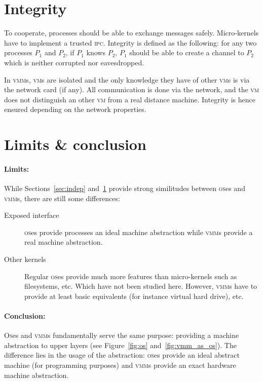 \documentclass[twocolumn]{article}
\newcommand{\vm}[0]{\textsc{vm}}
\newcommand{\vmm}[0]{\textsc{vmm}}
\newcommand{\os}[0]{\textsc{os}}
\begin{document}
\section{Integrity} 
\label{sec:int}
To cooperate, processes should be able to exchange messages safely. Micro-kernels have to implement a trusted \textsc{ipc}. Integrity is defined as the following: for any two processes $P_1$ and $P_2$, if $P_1$ knows $P_2$, $P_1$ should be able to create a channel to $P_2$ which is neither corrupted nor eavesdropped. 

In \vmm{}s, \vm{}s are isolated and the only knowledge they have of other \vm{}s is via the network card (if any). All communication is done via the network, and the \vm{} does not distinguish an other \vm{} from a real distance machine. Integrity is hence ensured depending on the network properties.

\section{Limits \& conclusion}
\paragraph{Limits:}
While Sections~\ref{sec:indep} and~\ref{sec:int} provide strong similitudes between \os{}es and \vmm{}s, there are still some differences: 
\begin{description}
	\item[Exposed interface] \os{}es provide processes an ideal machine abstraction while \vmm{}s provide a real machine abstraction. 
	\item[Other kernels] Regular \os{}es provide much more features than micro-kernels such as filesystems, etc. Which have not been studied here. However, \vmm{}s have to provide at least basic equivalents (for instance virtual hard drive), etc.
\end{description}

\paragraph{Conclusion:}
\textsc{Os}es and \vmm{}s fundamentally serve the same purpose: providing a machine abstraction to upper layers (see Figure~\ref{fig:os} and~\ref{fig:vmm_as_os}). The difference lies in the usage of the abstraction: \os{}es provide an ideal abstract machine (for programming purposes) and \vmm{}s provide an exact hardware machine abstraction. 
\end{document}
